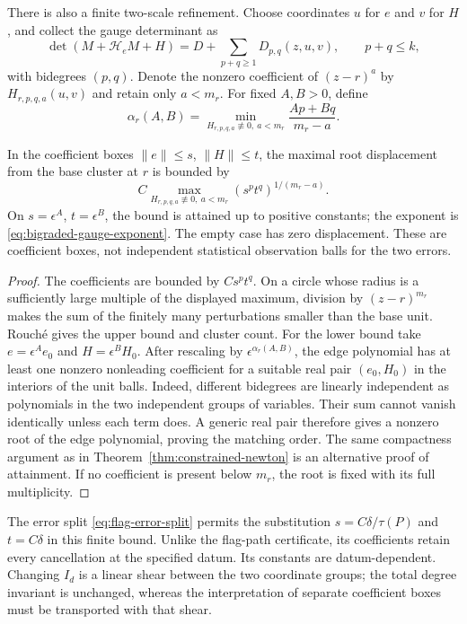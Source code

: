 There is also a finite two-scale refinement. Choose coordinates $u$
for $e$ and $v$ for $H$, and collect the gauge determinant as
\[
 \det(M+\mathcal H_eM+H)
   =D+\sum_{p+q\ge1}D_{p,q}(z,u,v),
 \qquad p+q\le k,
\]
with bidegrees $(p,q)$. Denote the nonzero coefficient of
$(z-r)^a$ by $H_{r,p,q,a}(u,v)$ and retain only $a<m_r$.
For fixed $A,B>0$, define
\begin{equation}\label{eq:bigraded-gauge-exponent}
 \alpha_r(A,B)=
   \min_{H_{r,p,q,a}\not\equiv0,\ a<m_r}
                        \frac{Ap+Bq}{m_r-a}.
\end{equation}
\begin{proposition}\label{prop:bigraded-gauge}
In the coefficient boxes $\|e\|\le s$, $\|H\|\le t$, the maximal
root displacement from the base cluster at $r$ is bounded by
\[
 C\max_{H_{r,p,q,a}\not\equiv0,\ a<m_r}
                     (s^p t^q)^{1/(m_r-a)}.
\]
On $s=\epsilon^A$, $t=\epsilon^B$, the bound is attained up to
positive constants; the exponent is \eqref{eq:bigraded-gauge-exponent}.
The empty case has zero displacement. These are coefficient boxes,
not independent statistical observation balls for the two errors.
\end{proposition}
\begin{proof}
The coefficients are bounded by $Cs^pt^q$. On a circle whose radius
is a sufficiently large multiple of the displayed maximum, division
by $(z-r)^{m_r}$ makes the sum of the finitely many perturbations
smaller than the base unit. Rouch\'e gives the upper bound and cluster
count. For the lower bound take $e=\epsilon^A e_0$ and
$H=\epsilon^B H_0$. After rescaling by
$\epsilon^{\alpha_r(A,B)}$, the edge polynomial has at least one
nonzero nonleading coefficient for a suitable real pair $(e_0,H_0)$
in the interiors of the unit balls. Indeed, different bidegrees are
linearly independent as polynomials in the two independent groups
of variables. Their sum cannot vanish identically unless each term
does. A generic real pair therefore gives a nonzero root of the
edge polynomial, proving the matching order. The same compactness
argument as in Theorem~\ref{thm:constrained-newton} is an alternative
proof of attainment. If no coefficient is present below $m_r$, the
root is fixed with its full multiplicity.
\end{proof}
The error split \eqref{eq:flag-error-split} permits the substitution
$s=C\delta/\tau(P)$ and $t=C\delta$ in this finite bound. Unlike the
flag-path certificate, its coefficients retain every cancellation at
the specified datum. Its constants are datum-dependent. Changing
$I_d$ is a linear shear between the two coordinate groups; the total
degree invariant is unchanged, whereas the interpretation of separate
coefficient boxes must be transported with that shear.

